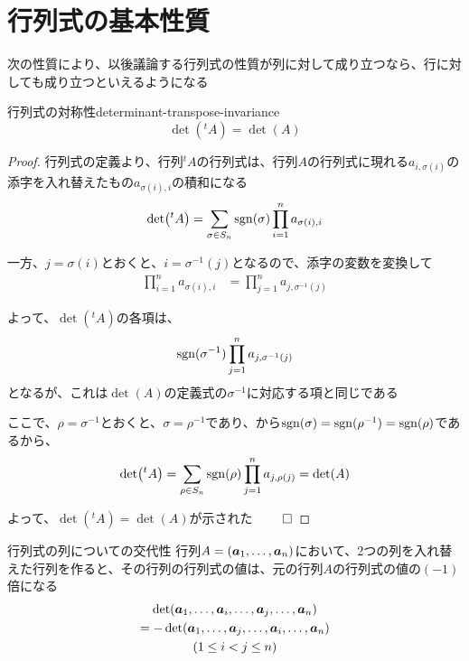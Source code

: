 \documentclass[../../../topic_linear-algebra]{subfiles}
\begin{document}
\sectionline
\section{行列式の基本性質}

次の性質により、以後議論する行列式の性質が列に対して成り立つなら、行に対しても成り立つといえるようになる

\begin{theorem}{行列式の対称性}{determinant-transpose-invariance}
  \begin{equation*}
    \det({}^t A) = \det(A)
  \end{equation*}
\end{theorem}

\begin{proof}
  行列式の定義より、行列${}^tA$の行列式は、行列$A$の行列式に現れる$a_{i,\sigma(i)}$の添字を入れ替えたもの$a_{\sigma(i),i}$の積和になる
  \begin{equation*}
    \det({}^t A) = \sum_{\sigma \in S_n} \operatorname{sgn}(\sigma) \prod_{i=1}^n a_{\sigma(i),i}
  \end{equation*}

  一方、$j=\sigma(i)$とおくと、$i = \sigma^{-1}(j)$となるので、添字の変数を変換して
  \begin{align*}
    \prod_{i=1}^n a_{\sigma(i),i}
     & = \prod_{j=1}^n a_{j,\sigma^{-1}(j)}
  \end{align*}

  よって、$\det({}^t A)$の各項は、
  \begin{equation*}
    \operatorname{sgn}(\sigma^{-1}) \prod_{j=1}^n a_{j,\sigma^{-1}(j)}
  \end{equation*}
  となるが、これは$\det(A)$の定義式の$\sigma^{-1}$に対応する項と同じである

  \br

  ここで、$\rho = \sigma^{-1}$とおくと、$\sigma = \rho^{-1}$であり、から$\operatorname{sgn}(\sigma) = \operatorname{sgn}(\rho^{-1}) = \operatorname{sgn}(\rho)$であるから、
  \begin{equation*}
    \det({}^t A) = \sum_{\rho \in S_n} \operatorname{sgn}(\rho) \prod_{j=1}^n a_{j,\rho(j)}  = \det(A)
  \end{equation*}

  よって、$\det({}^t A) = \det(A)$が示された $\qed$
\end{proof}

\sectionline

\begin{theorem*}{行列式の列についての交代性}
  行列$A = (\vb*{a}_1, \ldots, \vb*{a}_n)$において、2つの列を入れ替えた行列を作ると、その行列の行列式の値は、元の行列$A$の行列式の値の$(-1)$倍になる
  \begin{multline*}
    \det(\vb*{a}_1, \ldots, \vb*{a}_i, \ldots, \vb*{a}_j, \ldots, \vb*{a}_n) \\= -\det(\vb*{a}_1, \ldots, \vb*{a}_j, \ldots, \vb*{a}_i, \ldots, \vb*{a}_n) \\ (1 \leq i < j \leq n)
  \end{multline*}
\end{theorem*}
\end{document}
